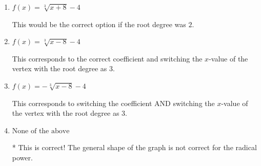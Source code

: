 \documentclass{extbook}[14pt]
\begin{document}
\begin{enumerate}
{\begin{enumerate}[label=\Alph*.]
This corresponds to switching the coefficient and having the correct vertex with the root degree as $3$.
\item \( f(x) = \sqrt[3]{x + 8} - 4 \)

This would be the correct option if the root degree was $2$.
\item \( f(x) = \sqrt[3]{x - 8} - 4 \)

This corresponds to the correct coefficient and switching the $x$-value of the vertex with the root degree as $3$.
\item \( f(x) = - \sqrt[3]{x - 8} - 4 \)

This corresponds to switching the coefficient AND switching the $x$-value of the vertex with the root degree as $3$.
\item \( \text{None of the above} \)

* This is correct! The general shape of the graph is not correct for the radical power.
\end{enumerate}

}
\end{enumerate}
\end{document}
